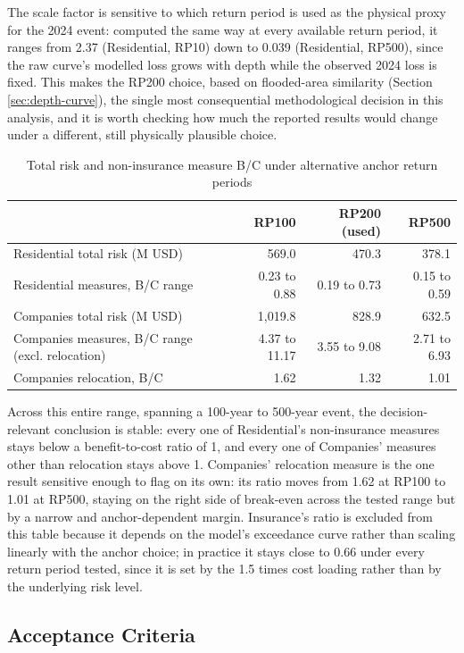 \documentclass[11pt]{article}
\begin{document}
The scale factor is sensitive to which return period is used as the physical proxy for the
2024 event: computed the same way at every available return period, it ranges from 2.37
(Residential, RP10) down to 0.039 (Residential, RP500), since the raw curve's modelled loss
grows with depth while the observed 2024 loss is fixed. This makes the RP200 choice, based
on flooded-area similarity (Section \ref{sec:depth-curve}), the single most consequential
methodological decision in this analysis, and it is worth checking how much the reported
results would change under a different, still physically plausible choice.

\begin{table}[H]
\centering
\caption{Total risk and non-insurance measure B/C under alternative anchor return periods}
\label{tab:sensitivity}
\small
\begin{tabular}{lrrr}
\toprule
& RP100 & RP200 (used) & RP500 \\
\midrule
Residential total risk (M USD) & 569.0 & 470.3 & 378.1 \\
Residential measures, B/C range & 0.23 to 0.88 & 0.19 to 0.73 & 0.15 to 0.59 \\
Companies total risk (M USD) & 1{,}019.8 & 828.9 & 632.5 \\
Companies measures, B/C range (excl. relocation) & 4.37 to 11.17 & 3.55 to 9.08 & 2.71 to 6.93 \\
Companies relocation, B/C & 1.62 & 1.32 & 1.01 \\
\bottomrule
\end{tabular}
\end{table}

Across this entire range, spanning a 100-year to 500-year event, the decision-relevant
conclusion is stable: every one of Residential's non-insurance measures stays below a
benefit-to-cost ratio of 1, and every one of Companies' measures other than relocation
stays above 1. Companies' relocation measure is the one result sensitive enough to flag on
its own: its ratio moves from 1.62 at RP100 to 1.01 at RP500, staying on the right side of
break-even across the tested range but by a narrow and anchor-dependent margin. Insurance's
ratio is excluded from this table because it depends on the model's exceedance curve rather
than scaling linearly with the anchor choice; in practice it stays close to 0.66 under every
return period tested, since it is set by the 1.5 times cost loading rather than by the
underlying risk level.

\subsection{Acceptance Criteria}
\label{sec:refinement}
\end{document}
